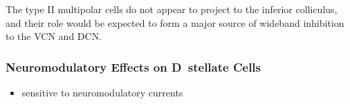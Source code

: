 The type II multipolar cells do not appear to project to the inferior colliculus, and their role would be expected to form a major source of wideband inhibition to the VCN and DCN. %














\subsubsection{Neuromodulatory Effects on D~stellate Cells}





\begin{itemize}
\item sensitive to neuromodulatory currents \citep{FujinoOertel:2001}
\end{itemize}



